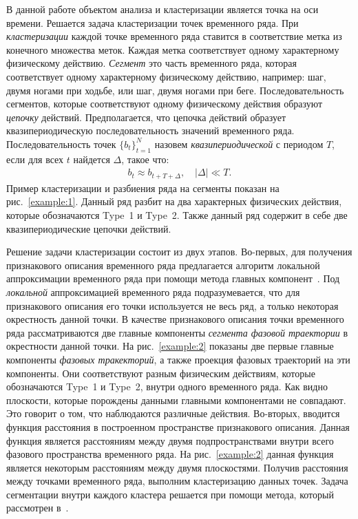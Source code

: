 \documentclass[12pt, twoside]{article}
\numberwithin{equation}{section}
\begin{document}
В данной работе объектом анализа и кластеризации является точка на оси времени. 
Решается задача кластеризации точек временного ряда. При \textit{кластеризации} каждой точке временного ряда ставится в соответствие метка из конечного множества меток. 
Каждая метка соответствует одному характерному физическому действию. \textit{Сегмент} это часть временного ряда, которая соответствует одному характерному физическому действию, например: шаг, двумя ногами при ходьбе, или шаг, двумя ногами при беге.
Последовательность сегментов, которые соответствуют одному физическому действия образуют \textit{цепочку} действий. 
Предполагается, что цепочка действий образует квазипериодическую последовательность значений временного ряда.
Последовательность точек $\{b_t\}_{t=1}^{N}$ назовем \textit{квазипериодической} с периодом $T$, если для всех $t$ найдется $\Delta$, такое что:
\begin{equation}
\label{eq:int:1}
\begin{aligned}
b_t \approx b_{t+T+\Delta}, \quad \left|\Delta\right| \ll T.
\end{aligned}
\end{equation}
Пример кластеризации и разбиения ряда на сегменты показан на  рис.~\ref{example:1}. Данный ряд разбит на два характерных физических действия, которые обозначаются Type~1 и Type~2. Также данный ряд содержит в себе две квазипериодические цепочки действий.

Решение задачи кластеризации состоит из двух этапов. 
Во-первых, для получения признакового описания временного ряда предлагается алгоритм локальной аппроксимации временного ряда при помощи метода главных компонент~\cite{Shiglavsi1997}. 
Под \textit{локальной} аппроксимацией временного ряда подразумевается, что для признакового описания его точки используется не весь ряд, а только некоторая окрестность данной точки. 
В качестве признакового описания точки временного ряда рассматриваются две главные компоненты \textit{сегмента фазовой траектории} в окрестности данной точки.
На рис.~\ref{example:2} показаны две первые главные компоненты \textit{фазовых тракекторий}, а также проекция фазовых траекторий на эти компоненты.
Они соответствуют разным физическим действиям, которые обозначаются Type~1 и Type~2, внутри одного временного ряда.
Как видно плоскости, которые порождены данными главными компонентами не совпадают. 
Это говорит о том, что наблюдаются различные действия. 
Во-вторых, вводится функция расстояния в построенном пространстве признакового описания. 
Данная функция является расстояниям между двумя подпространствами внутри всего фазового пространства временного ряда.
На рис.~\ref{example:2} данная функция является некоторым расстояниям между двумя плоскостями.
Получив расстояния между точками временного ряда, выполним кластеризацию данных точек.
Задача сегментации внутри каждого кластера решается при помощи метода, который рассмотрен в~\cite{motrenko2015}.
\end{document}
